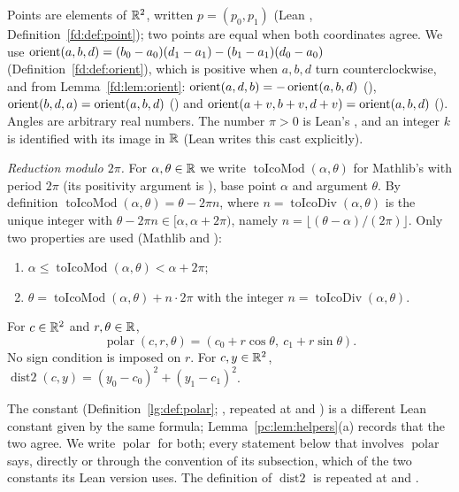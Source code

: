 Points are elements of $\mathbb R^2$, written $p=(p_0,p_1)$ (Lean , Definition~\ref{fd:def:point}); two
points are equal when both coordinates agree. We use
$\operatorname{orient}(a,b,d)=(b_0-a_0)(d_1-a_1)-(b_1-a_1)(d_0-a_0)$ (Definition~\ref{fd:def:orient}), which is positive when
$a,b,d$ turn counterclockwise, and from Lemma~\ref{fd:lem:orient}: $\operatorname{orient}(a,d,b)=-\operatorname{orient}(a,b,d)$
(), $\operatorname{orient}(b,d,a)=\operatorname{orient}(a,b,d)$ () and
$\operatorname{orient}(a+v,b+v,d+v)=\operatorname{orient}(a,b,d)$ (). Angles are arbitrary real numbers. The number
$\pi>0$ is Lean's , and an integer $k$ is identified with its image in $\mathbb R$ (Lean writes this cast
explicitly).

\emph{Reduction modulo $2\pi$.} For $\alpha,\theta\in\mathbb R$ we write $\operatorname{toIcoMod}(\alpha,\theta)$ for
Mathlib's  with period $2\pi$ (its positivity argument is ), base point
$\alpha$ and argument $\theta$. By definition $\operatorname{toIcoMod}(\alpha,\theta)=\theta-2\pi n$, where
$n=\operatorname{toIcoDiv}(\alpha,\theta)$ is the unique integer with $\theta-2\pi n\in[\alpha,\alpha+2\pi)$,
namely $n=\lfloor(\theta-\alpha)/(2\pi)\rfloor$. Only two properties are used (Mathlib 
and ):
\begin{enumerate}[label=(T\arabic*)]
\item $\alpha\le\operatorname{toIcoMod}(\alpha,\theta)<\alpha+2\pi$;
\item $\theta=\operatorname{toIcoMod}(\alpha,\theta)+n\cdot 2\pi$ with the integer
  $n=\operatorname{toIcoDiv}(\alpha,\theta)$.
\end{enumerate}

\begin{definition}\label{pc:def:polar}
For $c\in\mathbb R^2$ and $r,\theta\in\mathbb R$,
\[
  \operatorname{polar}(c,r,\theta)=(c_0+r\cos\theta,\ c_1+r\sin\theta).
\]
No sign condition is imposed on $r$. For $c,y\in\mathbb R^2$, $\operatorname{dist2}(c,y)=(y_0-c_0)^2+(y_1-c_1)^2$.
\end{definition}

The constant  (Definition~\ref{lg:def:polar};
, repeated at  and
) is a different Lean constant given by the same formula;
Lemma~\ref{pc:lem:helpers}(a) records that the two agree. We write $\operatorname{polar}$ for both; every
statement below that involves $\operatorname{polar}$ says, directly or through the convention of its subsection,
which of the two constants its Lean version uses. The definition of $\operatorname{dist2}$ is repeated at
 and .

